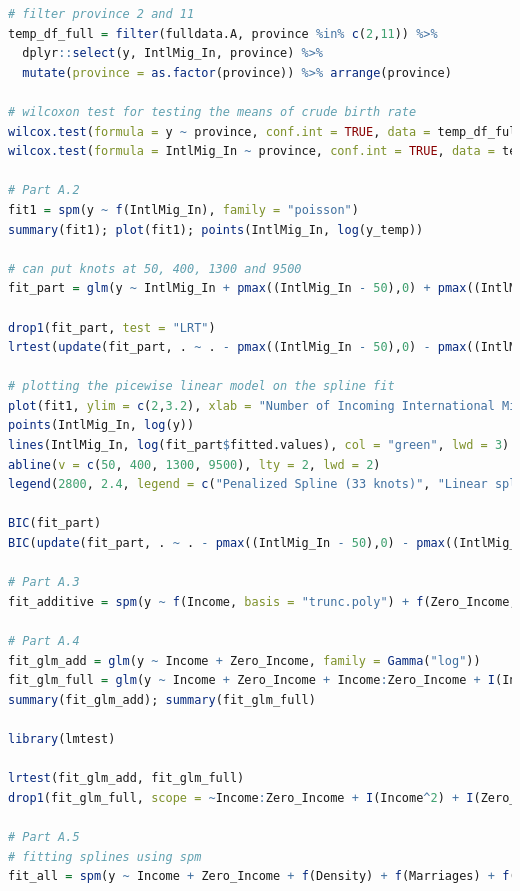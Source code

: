 \documentclass[paper=a4, fontsize=11pt]{scrartcl} %
\numberwithin{equation}{section} %
\begin{document}
\begin{lstlisting}[language = R, frame = single]
# filter province 2 and 11
temp_df_full = filter(fulldata.A, province %in% c(2,11)) %>% 
  dplyr::select(y, IntlMig_In, province) %>% 
  mutate(province = as.factor(province)) %>% arrange(province)

# wilcoxon test for testing the means of crude birth rate
wilcox.test(formula = y ~ province, conf.int = TRUE, data = temp_df_full)
wilcox.test(formula = IntlMig_In ~ province, conf.int = TRUE, data = temp_df_full)

# Part A.2
fit1 = spm(y ~ f(IntlMig_In), family = "poisson")
summary(fit1); plot(fit1); points(IntlMig_In, log(y_temp))

# can put knots at 50, 400, 1300 and 9500
fit_part = glm(y ~ IntlMig_In + pmax((IntlMig_In - 50),0) + pmax((IntlMig_In - 400),0) + pmax((IntlMig_In - 1300),0) + pmax((IntlMig_In - 9500),0), family = Gamma(link = "log")); summary(fit_part); plot(fit_part)

drop1(fit_part, test = "LRT")
lrtest(update(fit_part, . ~ . - pmax((IntlMig_In - 50),0) - pmax((IntlMig_In - 9500),0)), fit_part)

# plotting the picewise linear model on the spline fit
plot(fit1, ylim = c(2,3.2), xlab = "Number of Incoming International Migrants", ylab = "log(Expected birth rate per 1000)", lwd = 2)
points(IntlMig_In, log(y))
lines(IntlMig_In, log(fit_part$fitted.values), col = "green", lwd = 3)
abline(v = c(50, 400, 1300, 9500), lty = 2, lwd = 2)
legend(2800, 2.4, legend = c("Penalized Spline (33 knots)", "Linear spline w/ 4 knots (no penalization)"), col = c("black", "green"), lwd = c(2,3), lty = c(1,1)); title(main = "knots at 50, 400, 1300, 9500")

BIC(fit_part)
BIC(update(fit_part, . ~ . - pmax((IntlMig_In - 50),0) - pmax((IntlMig_In - 9500),0)))

# Part A.3
fit_additive = spm(y ~ f(Income, basis = "trunc.poly") + f(Zero_Income, basis = "trunc.poly"), family = "poisson"); summary(fit_additive); par(mfrow = c(1,2)); plot(fit_additive)

# Part A.4
fit_glm_add = glm(y ~ Income + Zero_Income, family = Gamma("log"))
fit_glm_full = glm(y ~ Income + Zero_Income + Income:Zero_Income + I(Income^2) + I(Zero_Income^2), family = Gamma("log"))
summary(fit_glm_add); summary(fit_glm_full)

library(lmtest)

lrtest(fit_glm_add, fit_glm_full)
drop1(fit_glm_full, scope = ~Income:Zero_Income + I(Income^2) + I(Zero_Income^2), test = "LRT")

# Part A.5
# fitting splines using spm
fit_all = spm(y ~ Income + Zero_Income + f(Density) + f(Marriages) + f(Divorces) + f(Deaths) + f(IntMig_In) + f(IntMig_Out) + f(IntlMig_In) + f(IntlMig_Out) + f(Nationality_In) + f(Population_Dec), family = "poisson", random = ~1, group = province); summary(fit_all); plot(fit_all, jitter.rug = TRUE)


\end{lstlisting}
\end{document}
